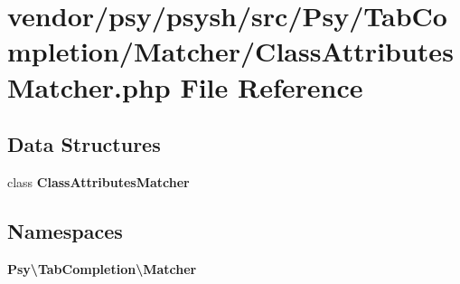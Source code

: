 \section{vendor/psy/psysh/src/\+Psy/\+Tab\+Completion/\+Matcher/\+Class\+Attributes\+Matcher.php File Reference}
\label{_class_attributes_matcher_8php}
\subsection*{Data Structures}
\begin{DoxyCompactItemize}
\item 
class {\bf Class\+Attributes\+Matcher}
\end{DoxyCompactItemize}
\subsection*{Namespaces}
\begin{DoxyCompactItemize}
\item 
 {\bf Psy\textbackslash{}\+Tab\+Completion\textbackslash{}\+Matcher}
\end{DoxyCompactItemize}
